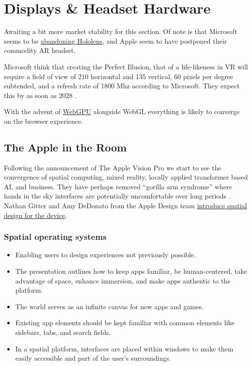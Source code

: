 \section{Displays \& Headset Hardware}
Awaiting a bit more market stability for this section. Of note is that Microsoft seems to be \href{https://www.windowscentral.com/microsoft/microsoft-has-laid-off-entire-teams-behind-virtual-mixed-reality-and-hololens}{abandoning Hololens}, and Apple seem to have postponed their commodity AR headset. \par
Microsoft think that creating the Perfect Illusion, that of a life-likeness in VR will require a field of view of 210 horizontal and  135 vertical, 60 pixels per degree subtended, and a refresh rate of 1800 Mhz according to Microsoft. They expect this by as soon as 2028 \cite{cuervo2018creating}.\par 
With the advent of \href{https://developer.chrome.com/docs/web-platform/webgpu/}{WebGPU} alongside WebGL everything is likely to converge on the browser experience.

\subsection{The Apple in the Room}
Following the announcement of The Apple Vision Pro we start to see the convergence of spatial computing, mixed reality, locally applied transformer based AI, and business.  They have perhaps removed ``gorilla arm syndrome'' \cite{boring2009scroll} where hands in the sky interfaces are potentially uncomfortable over long periods \cite{hansberger2017dispelling}. Nathan Gitter and Amy DeDonato from the Apple Design team \href{https://developer.apple.com/videos/play/wwdc2023/10072/}{introduce spatial design for the device}.
\subsubsection{Spatial operating systems}
\begin{itemize}
\item Enabling users to design experiences not previously possible.
\item The presentation outlines how to keep apps familiar, be human-centered, take advantage of space, enhance immersion, and make apps authentic to the platform.
\item The world serves as an infinite canvas for new apps and games.
\item Existing app elements should be kept familiar with common elements like sidebars, tabs, and search fields.
\item In a spatial platform, interfaces are placed within windows to make them easily accessible and part of the user's surroundings.
\end{itemize}
